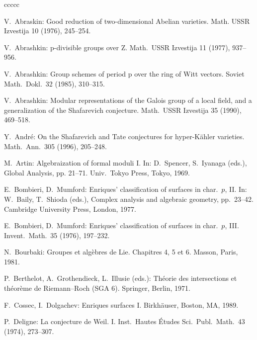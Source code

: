 \documentclass[oneside, 12pt]{amsart}
\theoremstyle{definition}
\theoremstyle{remark}
\begin{document}
 
\begin{thebibliography}{ccccc}

V.\ Abraskin:
Good reduction of two-dimensional Abelian varieties.  
Math. USSR Izvestija 10 (1976), 245--254.

V.\ Abrashkin:
p-divisible groups over Z. 
Math.\ USSR Izvestija 11 (1977), 937--956.

V.\ Abrashkin:
Group schemes of period p over the ring of Witt vectors. 
Soviet Math.\ Dokl.\ 32 (1985),  310--315.

V.\ Abrashkin:
Modular representations of the Galois group of a local field, and a generalization of the Shafarevich conjecture.
Math.\ USSR Izvestija 35 (1990), 469--518.

Y.\ Andr\'e:
On the Shafarevich and Tate conjectures for hyper-K\"ahler varieties.
Math.\ Ann.\ 305 (1996),   205--248. 

M.\ Artin: 
Algebraization of formal moduli I. 
In:  
D.\ Spencer, S.\ Iyanaga (eds.),
Global Analysis, pp. 21--71.
Univ.\ Tokyo Press, Tokyo, 1969. 

E.\ Bombieri, D.\ Mumford:
Enriques' classification of surfaces in char.\ $p$,  II.
In: 
W.\ Baily, T.\ Shioda (eds.), Complex analysis and algebraic geometry, pp.\ 23--42.
Cambridge University Press, London, 1977.

E.\ Bombieri, D.\ Mumford:
Enriques' classification of surfaces in char.\ $p$,  III.
Invent.\ Math.\ 35  (1976), 197--232.

N.\ Bourbaki:
Groupes et alg\`ebres de Lie. 
Chapitres 4, 5 et 6. 
Masson, Paris, 1981.
% 

P.\ Berthelot, A.\ Grothendieck, L.\ Illusie (eds.):
Th\'eorie des intersections et th\'eor\`eme de Riemann--Roch (SGA 6).
Springer, Berlin, 1971.

F.\ Cossec, I.\ Dolgachev:
Enriques surfaces I.
Birkh\"auser, Boston, MA, 1989.

P.\  Deligne:
La conjecture de Weil. I. 
Inst.\ Hautes \'Etudes Sci.\ Publ.\ Math.\  43 (1974), 273--307.


\end{thebibliography}
\end{document}
